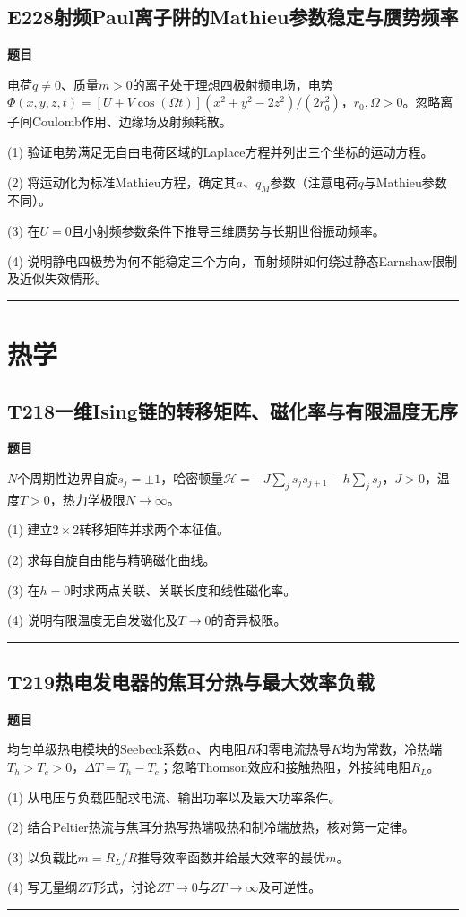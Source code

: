\documentclass[UTF8,a4paper,11pt,oneside,openany]{ctexbook}
\begin{document}
\section*{E228\quad 射频Paul离子阱的Mathieu参数稳定与赝势频率}
\textbf{题目}\par
电荷$q\ne0$、质量$m>0$的离子处于理想四极射频电场，电势$\Phi(x,y,z,t)=[U+V\cos(\Omega t)](x^2+y^2-2z^2)/(2r_0^2)$，$r_0,\Omega>0$。忽略离子间Coulomb作用、边缘场及射频耗散。
\par\smallskip\noindent (1) 验证电势满足无自由电荷区域的Laplace方程并列出三个坐标的运动方程。
\par\smallskip\noindent (2) 将运动化为标准Mathieu方程，确定其$a$、$q_M$参数（注意电荷$q$与Mathieu参数不同）。
\par\smallskip\noindent (3) 在$U=0$且小射频参数条件下推导三维赝势与长期世俗振动频率。
\par\smallskip\noindent (4) 说明静电四极势为何不能稳定三个方向，而射频阱如何绕过静态Earnshaw限制及近似失效情形。
\par\medskip\hrule\medskip
\chapter{热学}
\section*{T218\quad 一维Ising链的转移矩阵、磁化率与有限温度无序}
\textbf{题目}\par
$N$个周期性边界自旋$s_j=\pm1$，哈密顿量$\mathcal H=-J\sum_js_js_{j+1}-h\sum_js_j$，$J>0$，温度$T>0$，热力学极限$N\to\infty$。
\par\smallskip\noindent (1) 建立$2\times2$转移矩阵并求两个本征值。
\par\smallskip\noindent (2) 求每自旋自由能与精确磁化曲线。
\par\smallskip\noindent (3) 在$h=0$时求两点关联、关联长度和线性磁化率。
\par\smallskip\noindent (4) 说明有限温度无自发磁化及$T\to0$的奇异极限。
\par\medskip\hrule\medskip
\section*{T219\quad 热电发电器的焦耳分热与最大效率负载}
\textbf{题目}\par
均匀单级热电模块的Seebeck系数$\alpha$、内电阻$R$和零电流热导$K$均为常数，冷热端$T_h>T_c>0$，$\Delta T=T_h-T_c$；忽略Thomson效应和接触热阻，外接纯电阻$R_L$。
\par\smallskip\noindent (1) 从电压与负载匹配求电流、输出功率以及最大功率条件。
\par\smallskip\noindent (2) 结合Peltier热流与焦耳分热写热端吸热和制冷端放热，核对第一定律。
\par\smallskip\noindent (3) 以负载比$m=R_L/R$推导效率函数并给最大效率的最优$m$。
\par\smallskip\noindent (4) 写无量纲$ZT$形式，讨论$ZT\to0$与$ZT\to\infty$及可逆性。
\par\medskip\hrule\medskip
\end{document}
